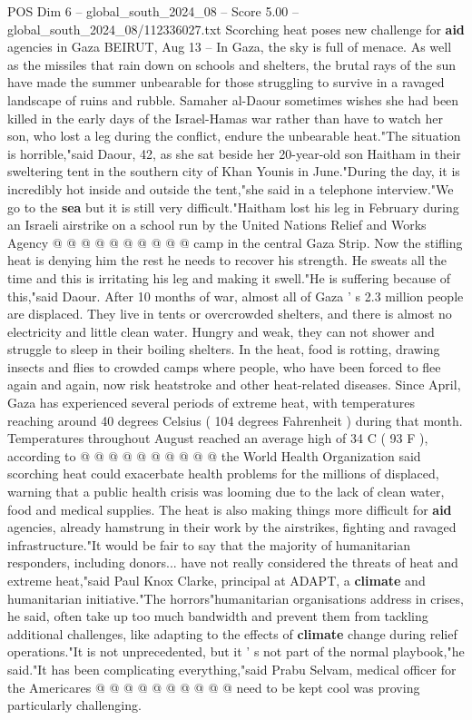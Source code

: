 \begin{textsample}{POS Dim 6 – global\_south\_2024\_08 – Score 5.00 – global\_south\_2024\_08/112336027.txt}  \label{ex:f6_pos_389}
Scorching heat poses new challenge for \textbf{aid} agencies in Gaza BEIRUT, Aug 13 -- In Gaza, the sky is full of menace.
As well as the missiles that rain down on schools and shelters, the brutal rays of the sun have made the summer unbearable for those struggling to survive in a ravaged landscape of ruins and rubble.
Samaher al-Daour sometimes wishes she had been killed in the early days of the Israel-Hamas war rather than have to watch her son, who lost a leg during the conflict, endure the unbearable heat."The situation is horrible,"said Daour, 42, as she sat beside her 20-year-old son Haitham in their sweltering tent in the southern city of Khan Younis in June."During the day, it is incredibly hot inside and outside the tent,"she said in a telephone interview."We go to the \textbf{sea} but it is still very difficult."Haitham lost his leg in February during an Israeli airstrike on a school run by the United Nations Relief and Works Agency @ @ @ @ @ @ @ @ @ @ camp in the central Gaza Strip.
Now the stifling heat is denying him the rest he needs to recover his strength.
He sweats all the time and this is irritating his leg and making it swell."He is suffering because of this,"said Daour.
After 10 months of war, almost all of Gaza ' s 2.3 million people are displaced.
They live in tents or overcrowded shelters, and there is almost no electricity and little clean water.
Hungry and weak, they can not shower and struggle to sleep in their boiling shelters.
In the heat, food is rotting, drawing insects and flies to crowded camps where people, who have been forced to flee again and again, now risk heatstroke and other heat-related diseases.
Since April, Gaza has experienced several periods of extreme heat, with temperatures reaching around 40 degrees Celsius ( 104 degrees Fahrenheit ) during that month.
Temperatures throughout August reached an average high of 34 C ( 93 F ), according to @ @ @ @ @ @ @ @ @ @ the World Health Organization said scorching heat could exacerbate health problems for the millions of displaced, warning that a public health crisis was looming due to the lack of clean water, food and medical supplies.
The heat is also making things more difficult for \textbf{aid} agencies, already hamstrung in their work by the airstrikes, fighting and ravaged infrastructure."It would be fair to say that the majority of humanitarian responders, including donors... have not really considered the threats of heat and extreme heat,"said Paul Knox Clarke, principal at ADAPT, a \textbf{climate} and humanitarian initiative."The horrors"humanitarian organisations address in crises, he said, often take up too much bandwidth and prevent them from tackling additional challenges, like adapting to the effects of \textbf{climate} change during relief operations."It is not unprecedented, but it ' s not part of the normal playbook,"he said."It has been complicating everything,"said Prabu Selvam, medical officer for the Americares @ @ @ @ @ @ @ @ @ @ need to be kept cool was proving particularly challenging.

\end{textsample}
